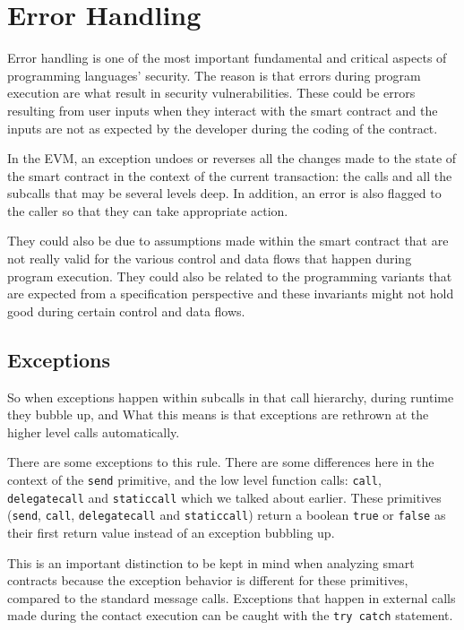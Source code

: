 \section{Error Handling}\label{error-handling}

Error handling is one of the most important fundamental and critical
aspects of programming languages' security. The reason is that errors
during program execution are what result in security vulnerabilities.
These could be errors resulting from user inputs when they interact with
the smart contract and the inputs are not as expected by the developer
during the coding of the contract.

In the EVM, an exception undoes or reverses all the changes made to the
state of the smart contract in the context of the current transaction:
the calls and all the subcalls that may be several levels deep. In
addition, an error is also flagged to the caller so that they can take
appropriate action.

They could also be due to assumptions made within the smart contract
that are not really valid for the various control and data flows that
happen during program execution. They could also be related to the
programming variants that are expected from a specification perspective
and these invariants might not hold good during certain control and data
flows.

\subsection{Exceptions}\label{exceptions}

So when exceptions happen within subcalls in that call hierarchy, during
runtime they bubble up, and What this means is that exceptions are
rethrown at the higher level calls automatically.

There are some exceptions to this rule. There are some differences here
in the context of the \texttt{send} primitive, and the low level
function calls: \texttt{call}, \texttt{delegatecall} and
\texttt{staticcall} which we talked about earlier. These primitives
(\texttt{send}, \texttt{call}, \texttt{delegatecall} and
\texttt{staticcall}) return a boolean \texttt{true} or \texttt{false} as
their first return value instead of an exception bubbling up.

This is an important distinction to be kept in mind when analyzing smart
contracts because the exception behavior is different for these
primitives, compared to the standard message calls. Exceptions that
happen in external calls made during the contact execution can be caught
with the \texttt{try\ catch} statement.

